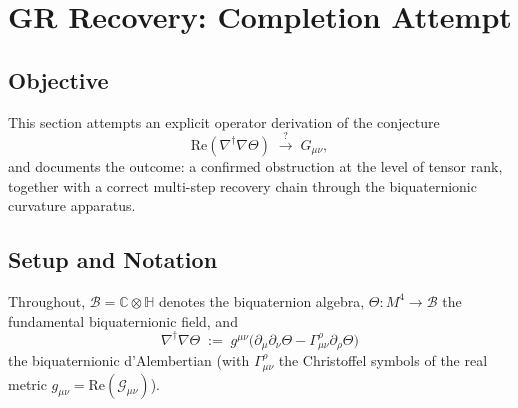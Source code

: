 %
%


\section{GR Recovery: Completion Attempt}
\label{sec:gr_completion_attempt}

\subsection{Objective}

This section attempts an explicit operator derivation of the conjecture
\begin{equation}
  \label{eq:conjecture_gr}
  \mathrm{Re}(\nabla^\dagger \nabla \Theta) \;\stackrel{?}{\longrightarrow}\; G_{\mu\nu},
\end{equation}
and documents the outcome: a confirmed obstruction at the level of tensor
rank, together with a correct multi-step recovery chain through the
biquaternionic curvature apparatus.

\subsection{Setup and Notation}

Throughout, $\mathcal{B} = \mathbb{C}\otimes\mathbb{H}$ denotes the biquaternion
algebra, $\Theta: M^4 \to \mathcal{B}$ the fundamental biquaternionic field, and
\begin{equation}
  \nabla^\dagger \nabla \Theta \;:=\; g^{\mu\nu}\bigl(\partial_\mu \partial_\nu\Theta
  - \Gamma^\rho_{\mu\nu}\partial_\rho\Theta\bigr)
\end{equation}
the biquaternionic d'Alembertian (with $\Gamma^\rho_{\mu\nu}$ the Christoffel
symbols of the real metric $g_{\mu\nu} = \mathrm{Re}(\mathcal{G}_{\mu\nu})$).

